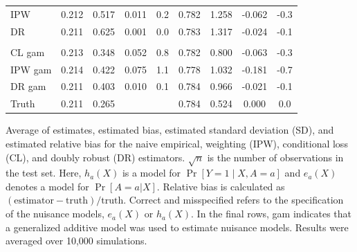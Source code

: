 \begin{table}[t]
\begin{threeparttable}
\begin{tabular}{lcccccccc}
    \hspace{1em}IPW & 0.212 & 0.517 & 0.011 & 0.2 & 0.782 & 1.258 & -0.062 & -0.3\\
    \hspace{1em}DR & 0.211 & 0.625 & 0.001 & 0.0 & 0.783 & 1.317 & -0.024 & -0.1\\
    \addlinespace[0.3em]
    \multicolumn{9}{l}{both misspecified}\\
    \hspace{1em}CL gam & 0.213 & 0.348 & 0.052 & 0.8 & 0.782 & 0.800 & -0.063 & -0.3\\
    \hspace{1em}IPW gam & 0.214 & 0.422 & 0.075 & 1.1 & 0.778 & 1.032 & -0.181 & -0.7\\
    \hspace{1em}DR gam & 0.211 & 0.403 & 0.010 & 0.1 & 0.784 & 0.966 & -0.021 & -0.1\\
    Truth & 0.211 & 0.265 &  &  & 0.784 & 0.524 & 0.000 & 0.0\\
    \bottomrule
    \end{tabular}
    \begin{tablenotes}
    \item Average of estimates, estimated bias, estimated standard deviation (SD), and estimated relative bias for the naive empirical, weighting (IPW), conditional loss (CL), and doubly robust (DR) estimators. $\sqrt{n}$ is the number of observations in the test set. Here, $h_a(X)$ is a model for $\operatorname{Pr}[Y=1 \mid X, A=a]$ and $e_a(X)$ denotes a model for $\Pr[A = a|X]$. Relative bias is calculated as $(\text{estimator} -\text{truth})/\text{truth}$. Correct and misspecified refers to the specification of the
    nuisance models, $e_a(X)$ or $h_a(X)$. In the final rows, gam indicates that a generalized additive model was used to estimate nuisance models. Results were averaged over 10,000 simulations.
    \end{tablenotes}
    \end{threeparttable}

\end{table}
